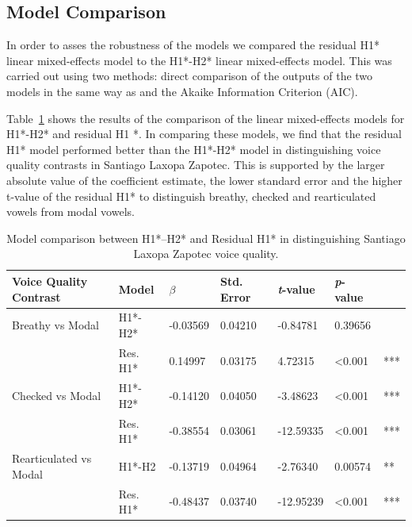 \subsection{Model Comparison} \label{sec:Comparison}

In order to asses the robustness of the models we compared the residual H1* linear mixed-effects model to the H1*-H2* linear mixed-effects model. This was carried out using two methods: direct comparison of the outputs of the two models in the same way as \citet{chaiH1H2Acoustic2022} and the Akaike Information Criterion (AIC). 

Table~\ref{tab:CGComparison} shows the results of the comparison of the linear mixed-effects models for H1*-H2* and residual H1 *. In comparing these models, we find that the residual H1* model performed better than the H1*-H2* model in distinguishing voice quality contrasts in Santiago Laxopa Zapotec. This is supported by the larger absolute value of the coefficient estimate, the lower standard error and the higher t-value of the residual H1* to distinguish breathy, checked and rearticulated vowels from modal vowels.

\begin{table}[!h]
  \centering
  \caption{Model comparison between H1*–H2* and Residual H1* in distinguishing Santiago Laxopa Zapotec voice quality.}
  \label{tab:CGComparison}
    \begin{tabular}{lllllll}
    Voice Quality Contrast & Model & \textit{$\beta$ } & Std. Error & \textit{t}-value & \textit{p}-value  &     \\
    \hline
      Breathy vs Modal &  H1*-H2* & -0.03569    & 0.04210         & -0.84781  & 0.39656 & \\
      & Res. H1* & 0.14997  & 0.03175 & 4.72315   & \textless 0.001   & *** \\
      Checked vs Modal & H1*-H2* & -0.14120    & 0.04050         & -3.48623  & \textless 0.001 & *** \\
      & Res. H1* & -0.38554 & 0.03061 & -12.59335 & \textless 0.001 & *** \\
      Rearticulated vs Modal & H1*-H2 & -0.13719   & 0.04964         & -2.76340 & 0.00574           & **  \\
     & Res. H1* & -0.48437 & 0.03740 & -12.95239 & \textless 0.001 & *** \\
    \end{tabular}
\end{table}

